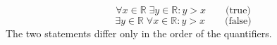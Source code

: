 \[
  \forall x \in \mathbb{R} \; \exists y \in \mathbb{R} : y > x
  \qquad \text{(true)}
\]
\[
  \exists y \in \mathbb{R} \; \forall x \in \mathbb{R} : y > x
  \qquad \text{(false)}
\]
The two statements differ only in the order of the quantifiers.
